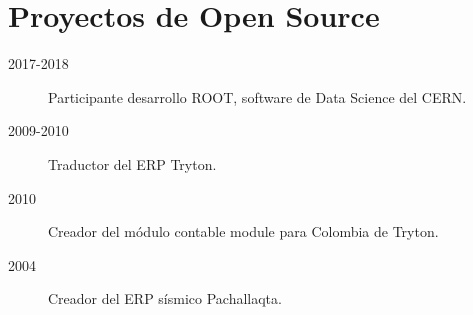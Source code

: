 \section{Proyectos de Open Source}

\begin{description}
\item[2017-2018] Participante desarrollo ROOT, software de Data Science del CERN.
\item[2009-2010] Traductor del ERP Tryton.
\item[2010] Creador del módulo contable module para Colombia de Tryton.
\item[2004] Creador del ERP sísmico Pachallaqta.
\end{description}

